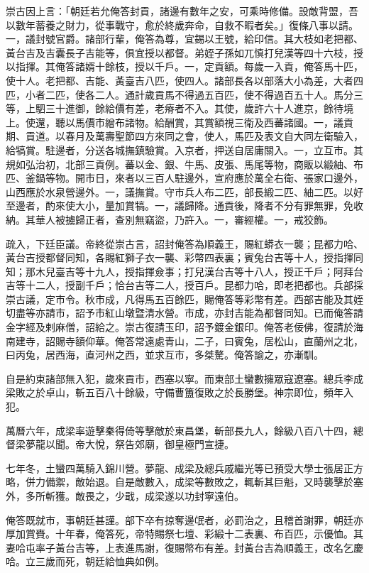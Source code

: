 \begin{pinyinscope}
崇古因上言：「朝廷若允俺答封貢，諸邊有數年之安，可乘時修備。設敵背盟，吾以數年蓄養之財力，從事戰守，愈於終歲奔命，自救不暇者矣。」復條八事以請。一，議封號官爵。諸部行輩，俺答為尊，宜錫以王號，給印信。其大枝如老把都、黃台吉及吉囊長子吉能等，俱宜授以都督。弟姪子孫如兀慎打兒漢等四十六枝，授以指揮。其俺答諸婿十餘枝，授以千戶。一，定貢額。每歲一入貢，俺答馬十匹，使十人。老把都、吉能、黃臺吉八匹，使四人。諸部長各以部落大小為差，大者四匹，小者二匹，使各二人。通計歲貢馬不得過五百匹，使不得過百五十人。馬分三等，上駟三十進御，餘給價有差，老瘠者不入。其使，歲許六十人進京，餘待境上。使還，聽以馬價市繒布諸物。給酬賞，其賞額視三衛及西蕃諸國。一，議貢期、貢道。以春月及萬壽聖節四方來同之會，使人，馬匹及表文自大同左衛驗入，給犒賞。駐邊者，分送各城撫鎮驗賞。入京者，押送自居庸關入。一，立互市。其規如弘治初，北部三貢例。蕃以金、銀、牛馬、皮張、馬尾等物，商販以緞紬、布匹、釜鍋等物。開市日，來者以三百人駐邊外，宣府應於萬全右衛、張家口邊外，山西應於水泉營邊外。一，議撫賞。守市兵人布二匹，部長緞二匹、紬二匹。以好至邊者，酌來使大小，量加賞犒。一，議歸降。通貢後，降者不分有罪無罪，免收納。其華人被擄歸正者，查別無竊盜，乃許入。一，審經權。一，戒狡飾。

疏入，下廷臣議。帝終從崇古言，詔封俺答為順義王，賜紅蟒衣一襲；昆都力哈、黃台吉授都督同知，各賜紅獅子衣一襲、彩幣四表裏；賓兔台吉等十人，授指揮同知；那木兒臺吉等十九人，授指揮僉事；打兒漢台吉等十八人，授正千戶；阿拜台吉等十二人，授副千戶；恰台吉等二人，授百戶。昆都力哈，即老把都也。兵部採崇古議，定市令。秋市成，凡得馬五百餘匹，賜俺答等彩幣有差。西部吉能及其姪切盡等亦請市，詔予市紅山墩暨清水營。市成，亦封吉能為都督同知。已而俺答請金字經及剌麻僧，詔給之。崇古復請玉印，詔予鍍金銀印。俺答老佞佛，復請於海南建寺，詔賜寺額仰華。俺答常遠處青山，二子，曰賓兔，居松山，直蘭州之北，曰丙兔，居西海，直河州之西，並求互市，多桀驁。俺答諭之，亦漸馴。

自是約束諸部無入犯，歲來貢市，西塞以寧。而東部土蠻數擁眾寇遼塞。總兵李成梁敗之於卓山，斬五百八十餘級，守備曹簠復敗之於長勝堡。神宗即位，頻年入犯。

萬曆六年，成梁率遊擊秦得倚等擊敵於東昌堡，斬部長九人，餘級八百八十四，總督梁夢龍以聞。帝大悅，祭告郊廟，御皇極門宣捷。

七年冬，土蠻四萬騎入錦川營。夢龍、成梁及總兵戚繼光等已預受大學士張居正方略，併力備禦，敵始退。自是敵數入，成梁等數敗之，輒斬其巨魁，又時襲擊於塞外，多所斬獲。敵畏之，少戢，成梁遂以功封寧遠伯。

俺答既就市，事朝廷甚謹。部下卒有掠奪邊氓者，必罰治之，且稽首謝罪，朝廷亦厚加賞賚。十年春，俺答死，帝特賜祭七壇、彩緞十二表裏、布百匹，示優恤。其妻哈屯率子黃台吉等，上表進馬謝，復賜幣布有差。封黃台吉為順義王，改名乞慶哈。立三歲而死，朝廷給恤典如例。


\end{pinyinscope}
